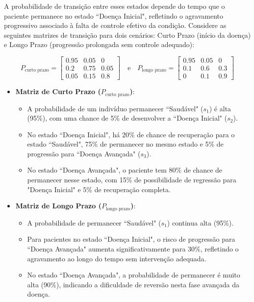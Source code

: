\documentclass[12pt]{article}
\theoremstyle{break}
\begin{document}
A probabilidade de transição entre esses estados depende do tempo que o paciente permanece no estado ``Doença Inicial", refletindo o agravamento progressivo associado à falta de controle efetivo da condição. Considere as seguintes matrizes de transição para dois cenários: Curto Prazo (início da doença) e Longo Prazo (progressão prolongada sem controle adequado):

\[
P_{\text{curto prazo}} = \begin{bmatrix} 0.95 & 0.05 & 0 \\ 0.2 & 0.75 & 0.05 \\ 0.05 & 0.15 & 0.8 \end{bmatrix} 
\quad \text{e} \quad 
P_{\text{longo prazo}} = \begin{bmatrix} 0.95 & 0.05 & 0 \\ 0.1 & 0.6 & 0.3 \\ 0 & 0.1 & 0.9 \end{bmatrix}
\]

\begin{itemize}
    \item \textbf{Matriz de Curto Prazo (\( P_{\text{curto prazo}} \))}:
    \begin{itemize}
        \item A probabilidade de um indivíduo permanecer ``Saudável" (\( s_1 \)) é alta (95\%), com uma chance de 5\% de desenvolver a ``Doença Inicial" (\( s_2 \)).
        \item No estado ``Doença Inicial", há 20\% de chance de recuperação para o estado ``Saudável", 75\% de permanecer no mesmo estado e 5\% de progressão para ``Doença Avançada" (\( s_3 \)).
        \item No estado ``Doença Avançada", o paciente tem 80\% de chance de permanecer nesse estado, com 15\% de possibilidade de regressão para "Doença Inicial" e 5\% de recuperação completa.
    \end{itemize}
    \item \textbf{Matriz de Longo Prazo (\( P_{\text{longo prazo}} \))}:
    \begin{itemize}
        \item A probabilidade de permanecer ``Saudável" (\( s_1 \)) continua alta (95\%).
        \item Para pacientes no estado ``Doença Inicial", o risco de progressão para ``Doença Avançada" aumenta significativamente para 30\%, refletindo o agravamento ao longo do tempo sem intervenção adequada.
        \item No estado ``Doença Avançada", a probabilidade de permanecer é muito alta (90\%), indicando a dificuldade de reversão nesta fase avançada da doença.
    \end{itemize}
\end{itemize}
\end{document}
